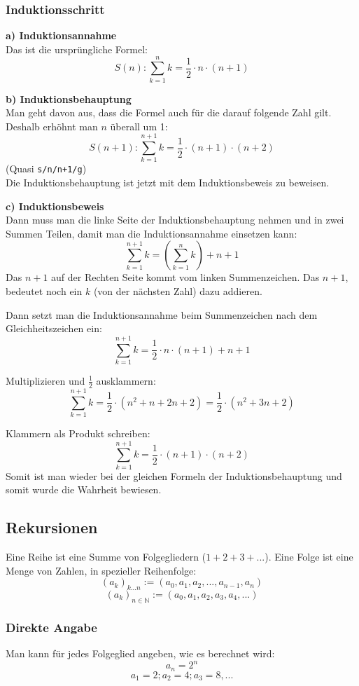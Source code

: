 \subsubsection{Induktionsschritt}
\textbf{a) Induktionsannahme} \\
Das ist die ursprüngliche Formel:
\[ S(n): \sum\limits_{k=1}^n k = \frac{1}{2} \cdot n \cdot (n + 1)\]

\textbf{b) Induktionsbehauptung} \\
Man geht davon aus, dass die Formel auch für die darauf folgende Zahl
gilt. Deshalb erhöhnt man $n$ überall um 1:
 \[ S(n + 1): \sum\limits_{k=1}^{n+1} k = \frac{1}{2} \cdot (n + 1) \cdot (n + 2)\]
(Quasi \texttt{s/n/n+1/g}) \\
Die Induktionsbehauptung ist jetzt mit dem Induktionsbeweis zu beweisen.

\textbf{c) Induktionsbeweis} \\
Dann muss man die linke Seite der Induktionsbehauptung nehmen und in zwei Summen Teilen,
damit man die Induktionsannahme einsetzen kann:
 \[ \sum\limits_{k=1}^{n+1} k = \left( \sum\limits_{k=1}^{n} k \right) + n + 1 \]
Das $n + 1$ auf der Rechten Seite kommt vom linken Summenzeichen.
Das $n + 1$, bedeutet noch ein $k$ (von der nächsten Zahl) dazu addieren.

Dann setzt man die Induktionsannahme beim Summenzeichen nach dem
Gleichheitszeichen ein:
 \[ \sum\limits_{k=1}^{n+1} k = \frac{1}{2} \cdot n \cdot (n + 1) + n + 1 \]

Multiplizieren und $\frac{1}{2}$ ausklammern:
 \[ \sum\limits_{k=1}^{n+1} k = \frac{1}{2} \cdot (n^2 + n + 2n + 2) =
 \frac{1}{2} \cdot (n^2 + 3n + 2) \]

Klammern als Produkt schreiben:
 \[ \sum\limits_{k=1}^{n+1} k = \frac{1}{2} \cdot (n + 1) \cdot (n + 2)\]
Somit ist man wieder bei der gleichen Formeln der Induktionsbehauptung
und somit wurde die Wahrheit bewiesen.

\subsection{Rekursionen}
Eine Reihe ist eine Summe von Folgegliedern ($1 + 2 + 3 + ...$). Eine Folge ist eine Menge
von Zahlen, in spezieller Reihenfolge:
\[ (a_k)_{k...n} := (a_0, a_1, a_2, ..., a_{n-1}, a_n) \]
\[ (a_k)_{n \in \mathbb{N}} := (a_0, a_1, a_2, a_3, a_4, ...) \]
\subsubsection{Direkte Angabe}
Man kann für jedes Folgeglied angeben, wie es berechnet wird:
\[ a_n = 2^n \]
\[ a_1 = 2; a_2 = 4; a_3 = 8, ... \]

